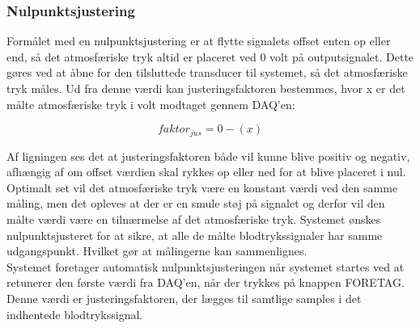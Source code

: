 \subsubsection{Nulpunktsjustering}
Formålet med en nulpunktsjustering er at flytte signalets offset enten op eller end, så det atmosfæriske tryk altid er placeret ved 0 volt på outputsignalet. Dette gøres ved at åbne for den tilsluttede transducer til systemet, så det atmosfæriske tryk måles. Ud fra denne værdi kan justeringsfaktoren bestemmes, hvor x er det målte atmosfæriske tryk i volt modtaget gennem DAQ’en:
\begin{ceqn}
\begin{equation}
faktor_{jus}=0-(x)
\end{equation}
\end{ceqn}
Af ligningen ses det at justeringsfaktoren både vil kunne blive positiv og negativ, afhængig af om offset værdien skal rykkes op eller ned for at blive placeret i nul. Optimalt set vil det atmosfæriske tryk være en konstant værdi ved den samme måling, men det opleves at der er en smule støj på signalet og derfor vil den målte værdi være en tilnærmelse af det atmosfæriske tryk. Systemet ønskes nulpunktsjusteret for at sikre, at alle de målte blodtrykssignaler har samme udgangspunkt. Hvilket gør at målingerne kan sammenlignes.\\
Systemet foretager automatisk nulpunktsjusteringen når systemet startes ved at retunerer den første værdi fra DAQ'en, når der trykkes på knappen FORETAG. Denne værdi er justeringsfaktoren, der lægges til samtlige samples i det indhentede blodtrykssignal.

